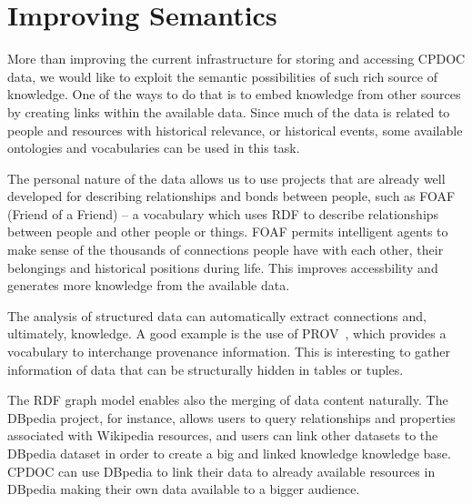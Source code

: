 
\section{Improving Semantics}\label{sec:mapping}

More than improving the current infrastructure for storing and
accessing CPDOC data, we would like to exploit the semantic
possibilities of such rich source of knowledge. One of the ways to do
that is to embed knowledge from other sources by creating links within
the available data. Since much of the data is related to people and
resources with historical relevance, or historical events, some
available ontologies and vocabularies can be used in this task.

The personal nature of the data allows us to use projects that are
already well developed for describing relationships and bonds between
people, such as FOAF~\cite{foaf} (Friend of a Friend) -- a vocabulary
which uses RDF to describe relationships between people and other
people or things. FOAF permits intelligent agents to make sense of the
thousands of connections people have with each other, their belongings
and historical positions during life. This improves accessbility and
generates more knowledge from the available data.

The analysis of structured data can automatically extract connections
and, ultimately, knowledge. A good example is the use of
PROV~\cite{prov}, which provides a vocabulary to interchange
provenance information. This is interesting to gather information of
data that can be structurally hidden in tables or tuples.  

The RDF graph model enables also the merging of data content
naturally. The DBpedia project, for instance, allows users to query
relationships and properties associated with Wikipedia resources, and
users can link other datasets to the DBpedia dataset in order to
create a big and linked knowledge knowledge base.
CPDOC can use DBpedia to link their data to already available
resources in DBpedia making their own data available to a bigger
audience.

